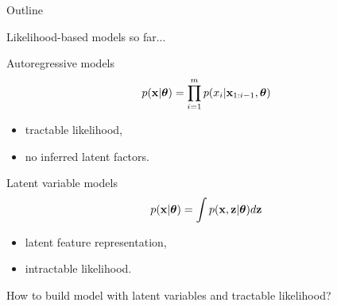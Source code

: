 \begin{frame}{Outline}
	\tableofcontents
\end{frame}
\begin{frame}{Likelihood-based models so far...}
	\begin{minipage}[t]{0.5\columnwidth}
		\begin{block}{Autoregressive models}
			\vspace{-0.5cm}
			\[
				p(\mathbf{x}|\boldsymbol{\theta}) = \prod_{i=1}^m p(x_i | \mathbf{x}_{1:i - 1}, \boldsymbol{\theta})
			\]
			\vspace{-0.2cm}
			\begin{itemize}
				\item tractable likelihood, 
				\item no inferred latent factors.
			\end{itemize}
		\end{block}
	\end{minipage}%
	\begin{minipage}[t]{0.5\columnwidth}
		\begin{block}{Latent variable models}
			\[
				p(\mathbf{x}| \boldsymbol{\theta}) = \int p(\mathbf{x}, \mathbf{z} | \boldsymbol{\theta}) d \mathbf{z}
			\]
			\begin{itemize}
				\item latent feature representation, 
				\item intractable likelihood.
			\end{itemize}
		\end{block}
	\end{minipage}
	
	\vspace{1cm } 
	How to build model with latent variables and tractable likelihood?
\end{frame}
